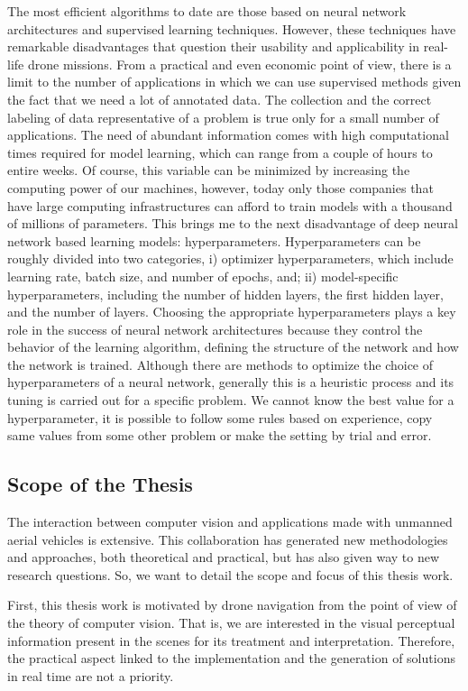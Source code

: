 The most efficient algorithms to date are those based on neural network architectures and supervised learning techniques. However, these techniques have remarkable disadvantages that question their usability and applicability in real-life drone missions. 
From a practical and even economic point of view, there is a limit to the number of applications in which we can use supervised methods given the fact that we need a lot of annotated data. The collection and the correct labeling of data representative of a problem is true only for a small number of applications. 
The need of abundant information comes with high computational times required for model learning, which can range from a couple of hours to entire weeks. Of course, this variable can be minimized by increasing the computing power of our machines, however, today only those companies that have large computing infrastructures can afford to train models with a thousand of millions of parameters. 
This brings me to the next disadvantage of deep neural network based learning models: hyperparameters. Hyperparameters can be roughly divided into two categories, i) optimizer hyperparameters, which include learning rate, batch size, and number of epochs, and; ii) model-specific hyperparameters, including the number of hidden layers, the first hidden layer, and the number of layers. Choosing the appropriate hyperparameters plays a key role in the success of neural network architectures because they control the behavior of the learning algorithm, defining the structure of the network and how the network is trained. Although there are methods to optimize the choice of hyperparameters of a neural network, generally this is a heuristic process and its tuning is carried out for a specific problem. We cannot know the best value for a hyperparameter, it is possible to follow some rules based on experience, copy same values from some other problem or make the setting by trial and error.

\subsection*{Scope of the Thesis}
The interaction between computer vision and applications made with unmanned aerial vehicles is extensive. This collaboration has generated new methodologies and approaches, both theoretical and practical, but has also given way to new research questions. So, we want to detail the scope and focus of this thesis work.

First, this thesis work is motivated by drone navigation from the point of view of the theory of computer vision. That is, we are interested in the visual perceptual information present in the scenes for its treatment and interpretation. Therefore, the practical aspect linked to the implementation and the generation of solutions in real time are not a priority.

